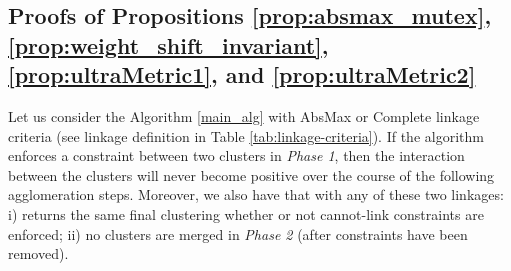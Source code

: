 \subsection{Proofs of Propositions \ref{prop:absmax_mutex}, \ref{prop:weight_shift_invariant}, \ref{prop:ultraMetric1}, and \ref{prop:ultraMetric2}  }
\label{sec:proposition_proofs}
\begin{lemma} \label{lemma:absMax_and_complete_property}
Let us consider the \algname{} Algorithm \ref{main_alg} with AbsMax or Complete linkage criteria (see linkage definition in Table \ref{tab:linkage-criteria}). If the algorithm enforces a constraint between two clusters in \emph{Phase 1}, then the interaction between the clusters will never become positive over the course of the following agglomeration steps. Moreover, we also have that with any of these two linkages: i) \algname{} returns the same final clustering whether or not cannot-link constraints are enforced; ii) no clusters are merged in \emph{Phase 2} (after constraints have been removed). 
\end{lemma}
